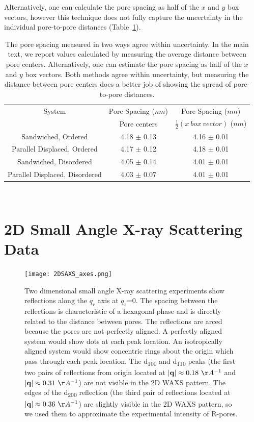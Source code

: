 \documentclass{article}
\begin{document}
  Alternatively, one can calculate the pore spacing as half of the $x$ and $y$
  box vectors, however this technique does not fully capture the uncertainty
  in the individual pore-to-pore distances (Table~\ref{table:p2p}). 
  
  \begin{table}[h]
  \centering
  \begin{tabular}{ccc}
  \toprule
  System                         & Pore Spacing ($nm$) & Pore Spacing ($nm$)              \\
                                 & Pore centers        & $\frac{1}{2}(x\ box\ vector)$ ($nm$) \\ 
  \midrule
  Sandwiched, Ordered            & 4.18 $\pm$ 0.13     & 4.16 $\pm$ 0.01                  \\
  Parallel Displaced, Ordered    & 4.17 $\pm$ 0.12     & 4.18 $\pm$ 0.01                  \\
  Sandwiched, Disordered         & 4.05 $\pm$ 0.14     & 4.01 $\pm$ 0.01                  \\
  Parallel Displaced, Disordered & 4.03 $\pm$ 0.07     & 4.01 $\pm$ 0.01                  \\
  \bottomrule
  \end{tabular}
  \caption{The pore spacing measured in two ways agree within uncertainty. In the main
  text, we report values calculated by measuring the average distance between pore centers. 
  Alternatively, one can estimate the pore spacing as half of the $x$ and $y$ box vectors.
  Both methods agree within uncertainty, but measuring the distance between pore centers
  does a better job of showing the spread of pore-to-pore distances.}~\label{table:p2p}
  \end{table}

  \clearpage

  \section{2D Small Angle X-ray Scattering Data}  
 
  \begin{figure}[!htb]
  \centering
  \texttt{[image: 2DSAXS\_axes.png]}
  \caption{Two dimensional small angle X-ray scattering experiments show
  reflections along the $q_r$ axis at $q_z$=0. The spacing between the reflections
  is characteristic of a hexagonal phase and is directly related to the distance
  between pores. The reflections are arced because the pores are not perfectly
  aligned. A perfectly aligned system would show dots at each peak location. An
  isotropically aligned system would show concentric rings about the origin which
  pass through each peak location. The d\textsubscript{100} and d\textsubscript{110} 
  peaks (the first two pairs of reflections from origin located at $|\mathbf{q}| 
  \approx 0.18~\AA^{-1}$ and $|\mathbf{q}| \approx 0.31~\AA^{-1}$) are not visible
  in the 2D WAXS pattern. The edges of the d\textsubscript{200} reflection (the third
  pair of reflections located at $|\mathbf{q}| \approx 0.36~\AA^{-1}$) are slightly
  visible in the 2D WAXS pattern, so we used them to approximate the experimental
  intensity of R-pores.}\label{fig:2DSAXS}
  \end{figure}
\end{document}
